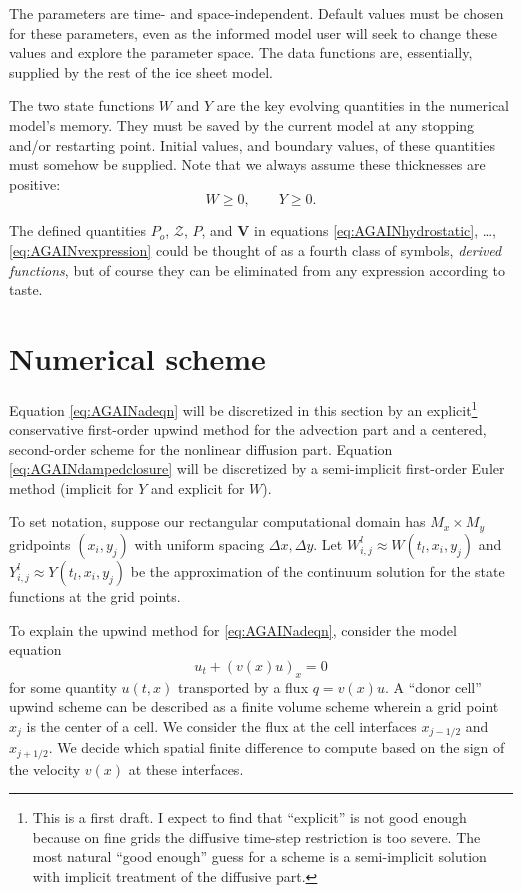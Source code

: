 \documentclass[12pt,final]{amsart}%
\newcommand\bV{\mathbf{V}}
\newcommand{\Wlij}{W^l_{i,j}}
\newcommand{\Ylij}{Y^l_{i,j}}
\begin{document}
\noindent The parameters are time- and space-independent.  Default values must be chosen for these parameters, even as the informed model user will seek to change these values and explore the parameter space.  The data functions are, essentially, supplied by the rest of the ice sheet model.

The two state functions $W$ and $Y$ are the key evolving quantities in the numerical model's memory.  They must be saved by the current model at any stopping and/or restarting point.  Initial values, and boundary values, of these quantities must somehow be supplied.  Note that we always assume these thicknesses are positive:
\begin{equation}
W \ge 0, \qquad Y \ge 0.
\end{equation}

The defined quantities $P_o$, $\mathcal{Z}$, $P$, and $\bV$ in equations \eqref{eq:AGAINhydrostatic}, \dots, \eqref{eq:AGAINvexpression} could be thought of as a fourth class of symbols, \emph{derived functions}, but of course they can be eliminated from any expression according to taste.


\section{Numerical scheme}

Equation \eqref{eq:AGAINadeqn} will be discretized in this section by an explicit\footnote{This is a first draft.  I expect to find that ``explicit'' is not good enough because on fine grids the diffusive time-step restriction is too severe.  The most natural ``good enough'' guess for a scheme is a semi-implicit solution with implicit treatment of the diffusive part.} conservative first-order upwind method for the advection part and a centered, second-order scheme for the nonlinear diffusion part.  Equation \eqref{eq:AGAINdampedclosure} will be discretized by a semi-implicit first-order Euler method (implicit for $Y$ and explicit for $W$).

To set notation, suppose our rectangular computational domain has $M_x \times M_y$ gridpoints $(x_i,y_j)$ with uniform spacing $\Delta x,\Delta y$.  Let $\Wlij \approx W(t_l,x_i,y_j)$ and $\Ylij \approx Y(t_l,x_i,y_j)$ be the approximation of the continuum solution for the state functions at the grid points.

To explain the upwind method for \eqref{eq:AGAINadeqn}, consider the model equation
\begin{equation} \label{eq:modeladvect}
u_t + (v(x) u)_x = 0
\end{equation}
for some quantity $u(t,x)$ transported by a flux $q = v(x) u$.  A ``donor cell'' upwind scheme can be described as a finite volume scheme \citep{LeVeque} wherein a grid point $x_j$ is the center of a cell.  We consider the flux at the cell interfaces $x_{j-1/2}$ and $x_{j+1/2}$.  We decide which spatial finite difference to compute based on the sign of the velocity $v(x)$ at these interfaces.
\end{document}
